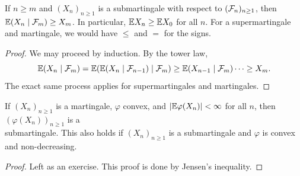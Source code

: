 \begin{fact} \label{fact:martingale_property_for_forwards_time}
    If $n \geq m$ and $(X_n)_{n \geq 1}$ is a submartingale with respect to $(\mathcal F_n)_{n \geq 1}$, then $\mathbb E(X_n \mid \mathcal F_m) \geq X_m$. In particular, $\mathbb E X_n \geq \mathbb E X_0$ for all $n$. For a supermartingale and martingale, we would have $\leq$ and $=$ for the signs.
\end{fact}
\begin{proof}
    We may proceed by induction. By the tower law,
    \[ \mathbb E(X_n \mid \mathcal F_m) = \mathbb E(\mathbb E(X_n \mid \mathcal F_{n-1}) \mid \mathcal F_m) \geq \mathbb E(X_{n-1} \mid \mathcal F_m) \dots \geq X_m. \]
    The exact same process applies for supermartingales and martingales.
\end{proof}

\begin{theorem} \label{thm:convex_submartingale}
    If $(X_n)_{n \geq 1}$ is a martingale, $\varphi$ convex, and $\left\lvert \mathbb E \varphi(X_n) \right\rvert < \infty$ for all $n$, then $(\varphi(X_n))_{n \geq 1}$ is a \\ submartingale. This also holds if $(X_n)_{n \geq 1}$ is a submartingale and $\varphi$ is convex and non-decreasing.
\end{theorem}
\begin{proof}
    Left as an exercise. This proof is done by Jensen's inequality.
\end{proof}


